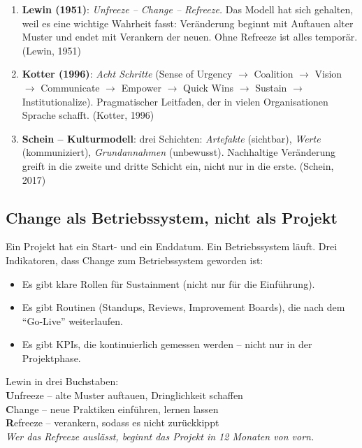 \documentclass[11pt,a4paper,oneside]{article}
\newcommand{\caveatfontfallback}{\itshape}
\newcommand\caveatfont{\caveatfontfallback}%
\newcommand{\akzent}[1]{{\caveatfont\color{lpAmber}#1}}
\newcommand{\fachbegriff}[1]{\textbf{#1}}
\newcommand{\quelle}[1]{{\footnotesize\color{lpGray}(#1)}}
\begin{document}
\begin{enumerate}
  \item \fachbegriff{Lewin (1951)}: \emph{Unfreeze -- Change -- Refreeze.} Das Modell hat sich gehalten, weil es eine wichtige Wahrheit fasst: Veränderung beginnt mit Auftauen alter Muster und endet mit Verankern der neuen. Ohne Refreeze ist alles temporär. \quelle{Lewin, 1951}
  \item \fachbegriff{Kotter (1996)}: \emph{Acht Schritte} (Sense of Urgency $\to$ Coalition $\to$ Vision $\to$ Communicate $\to$ Empower $\to$ Quick Wins $\to$ Sustain $\to$ Institutionalize). Pragmatischer Leitfaden, der in vielen Organisationen Sprache schafft. \quelle{Kotter, 1996}
  \item \fachbegriff{Schein -- Kulturmodell}: drei Schichten: \emph{Artefakte} (sichtbar), \emph{Werte} (kommuniziert), \emph{Grundannahmen} (unbewusst). Nachhaltige Veränderung greift in die zweite und dritte Schicht ein, nicht nur in die erste. \quelle{Schein, 2017}
\end{enumerate}

\subsection{Change als Betriebssystem, nicht als Projekt}

Ein Projekt hat ein Start- und ein Enddatum. Ein Betriebssystem läuft. Drei Indikatoren, dass Change zum Betriebssystem geworden ist:

\begin{itemize}
  \item Es gibt klare Rollen für Sustainment (nicht nur für die Einführung).
  \item Es gibt Routinen (Standups, Reviews, Improvement Boards), die nach dem ``Go-Live'' weiterlaufen.
  \item Es gibt KPIs, die kontinuierlich gemessen werden -- nicht nur in der Projektphase.
\end{itemize}

\begin{eselsbox}[Eselsbrücke: \akzent{U-C-R}]
Lewin in drei Buchstaben:\\[2pt]
\textbf{U}nfreeze -- alte Muster auftauen, Dringlichkeit schaffen\\
\textbf{C}hange -- neue Praktiken einführen, lernen lassen\\
\textbf{R}efreeze -- verankern, sodass es nicht zurückkippt\\[2pt]
\emph{Wer das Refreeze auslässt, beginnt das Projekt in 12 Monaten von vorn.}
\end{eselsbox}
\end{document}
